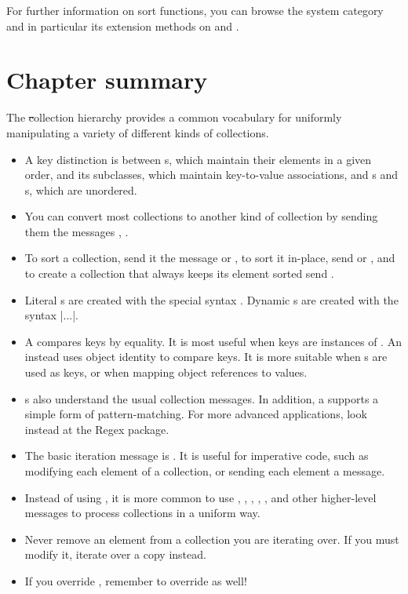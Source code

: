 \documentclass[a4paper,10pt,twoside]{book}
\begin{document}
For further information on sort functions, you can browse the system category  and in particular its extension methods on  and .

\section{Chapter summary}

The \st collection hierarchy provides a common vocabulary for uniformly manipulating a variety of different kinds of collections.

\begin{itemize}
  \item A key distinction is between s, which maintain their elements in a given order,  and its subclasses, which maintain key-to-value associations, and s and s, which are unordered.
  \item You can convert most collections to another kind of collection by sending them the messages ,  \etc.
  \item To sort a collection, send it the message  or , to sort it in-place, send  or , and to create a collection that always keeps its element sorted send .
  \item Literal s are created with the special syntax .
  Dynamic s are created with the syntax \ct|{...}|.
  \item A  compares keys by equality.
  It is most useful when keys are instances of . An  instead uses object identity to compare keys.
  It is more suitable when s are used as keys, or when mapping object references to values.
  \item {}s also understand the usual collection messages.
  In addition, a  supports a simple form of pattern-matching.
  For more advanced applications, look instead at the Regex package.
  \item The basic iteration message is .
  It is useful for imperative code, such as modifying each element of a collection, or sending each element a message.
  \item Instead of using , it is more common to use , , , , , and other higher-level messages to process collections in a uniform way.
  \item Never remove an element from a collection you are iterating over.
  If you must modify it, iterate over a copy instead.
  \item If you override \ct{=}, remember to override  as well!
\end{itemize}

\ifx\wholebook\relax\else
   
   
\end{document}
